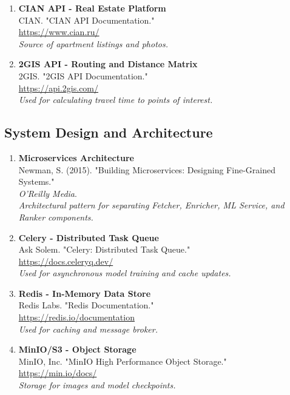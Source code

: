 \documentclass[12pt,a4paper]{article}
\begin{document}
\begin{enumerate}[resume]
    \item \textbf{CIAN API - Real Estate Platform}\\
    CIAN. "CIAN API Documentation."\\
    \url{https://www.cian.ru/}\\
    \textit{Source of apartment listings and photos.}
    
    \item \textbf{2GIS API - Routing and Distance Matrix}\\
    2GIS. "2GIS API Documentation."\\
    \url{https://api.2gis.com/}\\
    \textit{Used for calculating travel time to points of interest.}
\end{enumerate}

\subsection{System Design and Architecture}

\begin{enumerate}[resume]
    \item \textbf{Microservices Architecture}\\
    Newman, S. (2015). "Building Microservices: Designing Fine-Grained Systems." \\
    \textit{O'Reilly Media}.\\
    \textit{Architectural pattern for separating Fetcher, Enricher, ML Service, and Ranker components.}
    
    \item \textbf{Celery - Distributed Task Queue}\\
    Ask Solem. "Celery: Distributed Task Queue."\\
    \url{https://docs.celeryq.dev/}\\
    \textit{Used for asynchronous model training and cache updates.}
    
    \item \textbf{Redis - In-Memory Data Store}\\
    Redis Labs. "Redis Documentation."\\
    \url{https://redis.io/documentation}\\
    \textit{Used for caching and message broker.}
    
    \item \textbf{MinIO/S3 - Object Storage}\\
    MinIO, Inc. "MinIO High Performance Object Storage."\\
    \url{https://min.io/docs/}\\
    \textit{Storage for images and model checkpoints.}
\end{enumerate}
\end{document}
